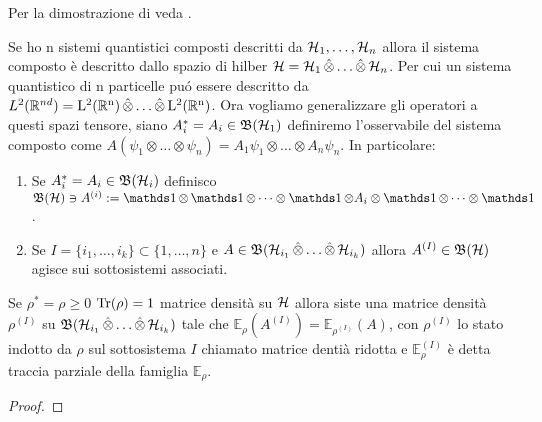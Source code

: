 Per la dimostrazione di veda \cite{Hall}.

Se ho n sistemi quantistici composti descritti da $\operatorname{\mathcal{H}}_1, \dots, \operatorname{\mathcal{H}}_n$ allora il sistema composto è descritto dallo spazio di hilber $\operatorname{\mathcal{H}} = \operatorname{\mathcal{H}}_1 \operatorname{\hat{\otimes}} \dots \operatorname{\hat{\otimes}} \operatorname{\mathcal{H}}_n$. 
Per cui un sistema quantistico di n particelle puó essere descritto da $L^2(\mathbb{R}^{nd})= \operatorname{L^2(\mathbb{R}^n)} \operatorname{\hat{\otimes}} \dots \operatorname{\hat{\otimes}} \operatorname{L^2(\mathbb{R}^n)}$. Ora vogliamo generalizzare gli operatori a questi spazi tensore, 
siano $A_i^* = A_i\in \mathfrak{B}(\operatorname{\mathcal{H}}_1)$ definiremo l'osservabile del sistema composto come $A(\psi_1 \otimes \dots \otimes \psi_n)= A_1 \psi_1 \otimes \dots \otimes A_n \psi_n$.
In particolare:
\begin{enumerate}
    \item Se $A_i^* = A_i\in \mathfrak{B}(\operatorname{\mathcal{H}}_i)$ definisco $\B \ni A^{ (i)} := \un \otimes \un \otimes \dots \otimes \un \otimes A_i \otimes \un \otimes \dots \otimes \un$.
    \item Se $I = \{ i_1, \dots , i_k \} \subset \{1, \dots , n \}$ e $A \in \mathfrak{B}(\operatorname{\mathcal{H}}_{i_1}\operatorname{\hat{\otimes}} \dots \operatorname{\hat{\otimes}} \operatorname{\mathcal{H}}_{i_k})$ allora $A^{ (I)} \in \operatorname{\mathfrak{B}(\mathcal{H})}$ agisce sui sottosistemi associati.
\end{enumerate}

\begin{theorem}
    Se $\rho^* = \rho \geq 0$ $\Tr(\rho) = 1$ matrice densità su $\operatorname{\mathcal{H}}$ allora siste una matrice densità $\rho^{(I)}$ su $\mathfrak{B}(\operatorname{\mathcal{H}}_{i_1}\operatorname{\hat{\otimes}} \dots \operatorname{\hat{\otimes}} \operatorname{\mathcal{H}}_{i_k})$ tale che $\mathbb{E}_\rho(A^{(I)}) = \mathbb{E}_{\rho^{(I)}}(A)$, con $\rho^{(I)}$ lo stato indotto da $\rho$ sul sottosistema $I$ chiamato matrice dentià ridotta e $\mathbb{E}_\rho^{(I)}$ è detta traccia parziale della famiglia $\mathbb{E}_\rho$.
\end{theorem}

\begin{proof}
\end{proof}

